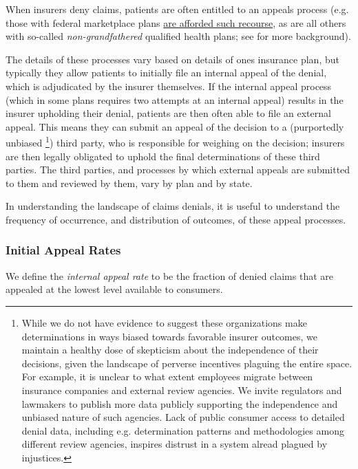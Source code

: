 \documentclass[12pt, a4paper,twoside,parskip=full]{report}
\theoremstyle{plain} %
\theoremstyle{definition} %
\theoremstyle{remark} %
\numberwithin{equation}{chapter}
\begin{document}
		When insurers deny claims, patients are often entitled to an appeals process (e.g. those with federal marketplace plans \href{https://www.healthcare.gov/appeal-insurance-company-decision/appeals/}{are afforded such recourse}, as are all others with so-called \emph{non-grandfathered} qualified health plans; see \cite{pollitz2021} for more background).
		
		The details of these processes vary based on details of ones insurance plan, but typically they allow patients to initially file an internal appeal of the denial, which is adjudicated by the insurer themselves. If the internal appeal process (which in some plans requires two attempts at an internal appeal) results in the insurer upholding their denial, patients are then often able to file an external appeal. This means they can submit an appeal of the decision to a (purportedly unbiased \footnote{While we do not have evidence to suggest these organizations make determinations in ways biased towards favorable insurer outcomes, we maintain a healthy dose of skepticism about the independence of their decisions, given the landscape of perverse incentives plaguing the entire space. For example, it is unclear to what extent employees migrate between insurance companies and external review agencies. We invite regulators and lawmakers to publish more data publicly supporting the independence and unbiased nature of such agencies. Lack of public consumer access to detailed denial data, including e.g. determination patterns and methodologies among different review agencies, inspires distrust in a system alread plagued by injustices.}) third party, who is responsible for weighing on the decision; insurers are then legally obligated to uphold the final determinations of these third parties. The third parties, and processes by which external appeals are submitted to them and reviewed by them, vary by plan and by state.
		
		In understanding the landscape of claims denials, it is useful to understand the frequency of occurrence, and distribution of outcomes, of these appeal processes.
		
		\subsubsection{Initial Appeal Rates}
		
		We define the \emph{internal appeal rate} to be the fraction of denied claims that are appealed at the lowest level available to consumers.
		
\end{document}
